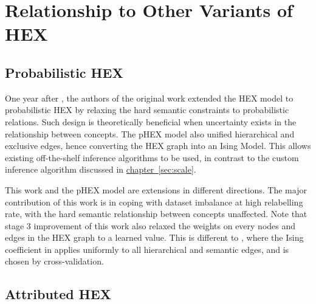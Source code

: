 \documentclass[11pt,a4paper]{book}
\begin{document}
\chapter{Relationship to Other Variants of HEX}
\section{Probabilistic HEX}

One year after \cite{deng2014large}, the authors of the original work extended the HEX model to probabilistic HEX \cite{ding2015probabilistic} by relaxing the hard semantic constraints to probabilistic relations. Such design is theoretically beneficial when uncertainty exists in the relationship between concepts. The pHEX model also unified hierarchical and exclusive edges, hence converting the HEX graph into an Ising Model. This allows existing off-the-shelf inference algorithms to be used, in contrast to the custom inference algorithm discussed in \hyperref[sec:scale]{chapter~\ref{sec:scale}}.

This work and the pHEX model are extensions in different directions. The major contribution of this work is in coping with dataset imbalance at high relabelling rate, with the hard semantic relationship between concepts unaffected. Note that stage 3 improvement of this work also relaxed the weights on every nodes and edges in the HEX graph to a learned value. This is different to \cite{ding2015probabilistic}, where the Ising coefficient in applies uniformly to all hierarchical and semantic edges, and is chosen by cross-validation.

\section{Attributed HEX}
\end{document}
